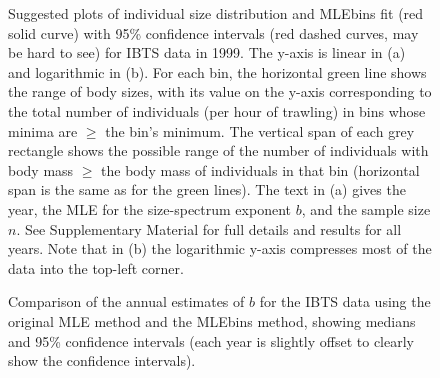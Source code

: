 \clearpage
\thispagestyle{empty}
\begin{figure}[tp]
\begin{center}
\vspace{-14mm}
\end{center}
\vspace{-9mm}
\caption{Suggested plots of individual size distribution and MLEbins fit
            (red solid curve)
            with 95\% confidence intervals (red dashed curves, may be hard to
            see) for IBTS data in 1999. The y-axis is linear in (a) and logarithmic
            in (b).
            For each bin, the horizontal green line shows
            the range of body sizes,
            with its value on the y-axis corresponding to the
            total number of individuals (per hour of trawling) in bins whose
            minima are $\geq$ the
            bin's minimum.
            The vertical span of each grey rectangle shows the
            possible range of the number of individuals with body mass
            $\geq$ the body mass of individuals in that bin (horizontal span
            is the same as for the green lines).
            The text in (a) gives the year,
            the MLE for the size-spectrum exponent $b$, and the sample size $n$.
            See Supplementary Material for
            full details and results for all years.
            Note that in (b) the logarithmic y-axis compresses most of the data
            into the top-left corner.}
\label{fig:ISD-1999.main}
\end{figure}
\clearpage

\begin{figure}[tp]
\begin{center}
\epsfxsize=6in
  \end{center}
  \caption{Comparison of the annual estimates of
  $b$ for the IBTS data using the original MLE method and the MLEbins method,
  showing medians and 95\% confidence intervals (each year is slightly offset
  to clearly show the confidence intervals).}
\label{fig:nSeaFung/nSeaFungCompareTrends}
\end{figure}

\clearpage


